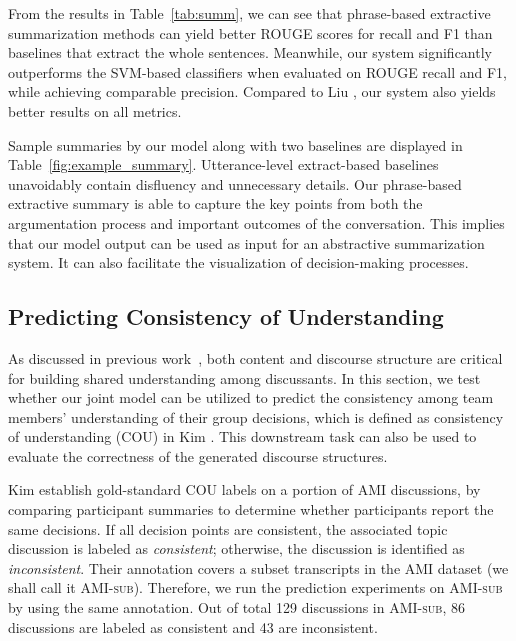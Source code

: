 From the results in Table~\ref{tab:summ}, we can see that phrase-based extractive summarization methods can yield better ROUGE scores for recall and F1 than baselines that extract the whole sentences. 
%
Meanwhile, our system significantly outperforms the SVM-based classifiers when evaluated on ROUGE recall and F1, while achieving comparable precision. Compared to Liu \cite{liu2009unsupervised}, our system also yields better results on all metrics.

Sample summaries by our model along with two baselines are displayed in Table~\ref{fig:example_summary}. Utterance-level extract-based baselines unavoidably contain disfluency and unnecessary details. Our phrase-based extractive summary is able to capture the key points from both the argumentation process and important outcomes of the conversation. This implies that our model output can be used as input for an abstractive summarization system. It can also facilitate the visualization of decision-making processes.



\subsection{Predicting Consistency of Understanding}
As discussed in previous work~\cite{mulder2002assessing,mercer2004sociocultural}, both content and discourse structure are critical for building shared understanding among discussants. 
In this section, we test whether our joint model can be utilized to predict the consistency among team members' understanding of their group decisions, which is defined as consistency of understanding (COU) in Kim \cite{kim2016improving}. This downstream task can also be used to evaluate the correctness of the generated discourse structures.%

Kim \cite{kim2016improving} establish gold-standard COU labels on a portion of AMI discussions, by comparing participant summaries to determine whether participants report the same decisions. If all decision points are consistent, the associated topic discussion is labeled as \textit{consistent}; otherwise, the discussion is identified as \textit{inconsistent}. Their annotation covers a subset transcripts in the \textsc{AMI} dataset (we shall call it \textsc{AMI-sub}). Therefore, we run the prediction experiments on \textsc{AMI-sub} by using the same annotation. 
Out of total 129 discussions in \textsc{AMI-sub}, 86 discussions are labeled as consistent and 43 are inconsistent. 

